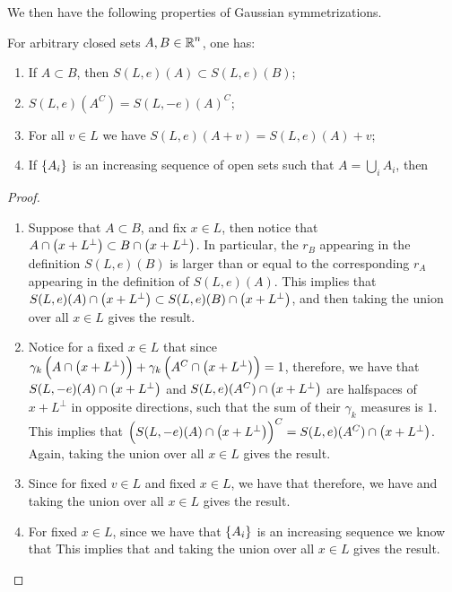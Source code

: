\documentclass[../main.tex]{subfiles}
\begin{document}
We then have the following properties of Gaussian symmetrizations.
\begin{proposition}
\label{prop:Gauss_symm_properties}
For arbitrary closed sets $A,B\in\operatorname{\mathbb{R}}^n$, one has:
\begin{enumerate}
    \item If $A\subset B$, then $S(L,e)(A)\subset S(L,e)(B)$;
    \item $S(L,e)(A^C) = S(L,-e)(A)^C$;
    \item For all $v\in L$ we have $S(L,e)(A+v) = S(L,e)(A)+v$;
    \item If $\cbr{A_i}$ is an increasing sequence of open sets such that $A = \bigcup_i A_i$, then 
\end{enumerate}
\end{proposition}
\begin{proof}
\begin{enumerate}
    \item Suppose that $A\subset B$, and fix $x\in L$, then notice that $A\cap\del{x + L^\perp}\subset B\cap\del{x + L^\perp}$. In particular, the $r_B$ appearing in the definition $S(L,e)(B)$ is larger than or equal to the corresponding $r_A$ appearing in the definition of $S(L,e)(A)$. This implies that $S(L,e)(A)\cap\del{x + L^\perp}\subset S(L,e)(B)\cap\del{x + L^\perp}$, and then taking the union over all $x\in L$ gives the result.
    \item Notice for a fixed $x\in L$ that since $\gamma_k\del{A\cap\del{x + L^\perp}} + \gamma_k\del{A^C\cap\del{x + L^\perp}} = 1$, therefore, we have that $S(L,-e)(A)\cap\del{x + L^\perp}$ and $S(L,e)(A^C)\cap\del{x + L^\perp}$ are halfspaces of $x + L^\perp$ in opposite directions, such that the sum of their $\gamma_k$ measures is $1$. This implies that $\del{S(L,-e)(A)\cap\del{x + L^\perp}}^C = S(L,e)(A^C)\cap\del{x + L^\perp}$. Again, taking the union over all $x\in L$ gives the result.
    \item Since for fixed $v\in L$ and fixed $x\in L$, we have that  therefore, we have  and taking the union over all $x\in L$ gives the result. 
    \item For fixed $x\in L$, since we have that $\cbr{A_i}$ is an increasing sequence we know that  This implies that  and taking the union over all $x\in L$ gives the result.
\end{enumerate}
\end{proof}
\end{document}
